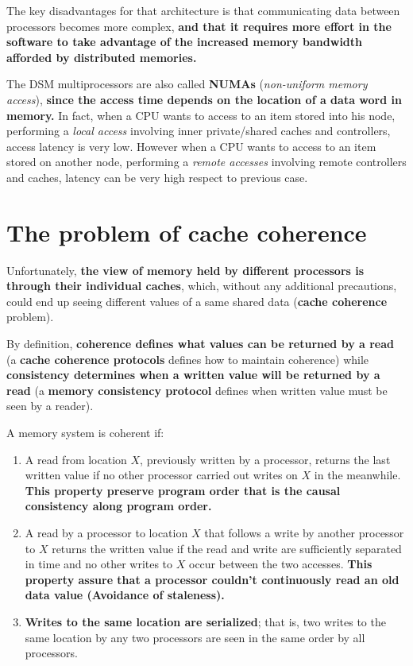 \documentclass[10pt,a4paper]{article}
\begin{document}
The key disadvantages for that architecture is that communicating data between processors becomes more complex, \textbf{and that it requires more effort in the software to take advantage of the increased memory bandwidth afforded by distributed memories.}

The DSM multiprocessors are also called \textbf{NUMAs} (\textit{non-uniform memory access}), \textbf{since the access time depends on the location of a data word in memory.} In fact, when a CPU wants to access to an item stored into his node, performing a \textit{local access} involving inner private/shared caches and controllers, access latency is very low. However when a CPU wants to access to an item stored on another node, performing a \textit{remote accesses} involving remote controllers and caches, latency can be very high respect to previous case.

\section{The problem of cache coherence}

Unfortunately, \textbf{the view of memory held by different processors is through their individual caches}, which, without any additional precautions, could end up seeing different values of a same shared data (\textbf{cache coherence} problem).

By definition, \textbf{coherence defines what values can be returned by a read} (a \textbf{cache coherence protocols} defines how to maintain coherence) while \textbf{consistency determines when a written value will be returned by a read} (a \textbf{memory consistency protocol} defines when written value must be seen by a reader).

A memory system is coherent if:
\begin{enumerate}
\item A read from location $X$, previously written by a processor, returns the last written value if no other processor carried out writes on $X$ in the meanwhile. \textbf{This property preserve program order that is the causal consistency along program order.}

\item A read by a processor to location $X$ that follows a write by another processor to $X$ returns the written value if the read and write are sufficiently separated in time and no other writes to $X$ occur between the two accesses. \textbf{This property assure that a processor couldn't continuously
read an old data value (Avoidance of staleness).}

\item \textbf{Writes to the same location are serialized}; that is, two writes to the same location by any two processors are seen in the same order by all processors.
\end{enumerate}
\end{document}
